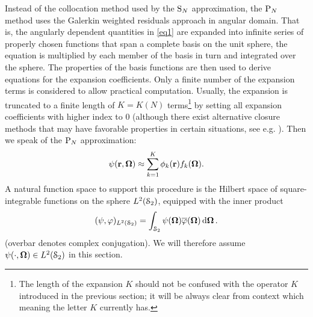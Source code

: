 Instead of the collocation method used by the $\SN$ approximation, the $\PN$ method uses the Galerkin weighted residuals
approach in angular domain. That is, the angularly dependent quantities in \eqref{eq1} are expanded into infinite
series of properly chosen functions that span a complete basis on the unit sphere, the equation is multiplied by each member of the basis in turn
and integrated over the sphere. The properties of the basis functions are then used to derive equations for
the expansion coefficients. Only a finite number of the expansion terms is considered to allow practical computation.
Usually, the expansion is truncated to a finite length of $K = K(N)$ terms\footnote{The length of the expansion $K$
should not be confused with the operator $K$ introduced in the previous section; it will be always clear from context 
which meaning the letter $K$ currently has.} by setting all expansion coefficients with higher index to 0 (although there exist alternative closure methods that may have favorable properties in certain situations, see e.g.
\cite{Frank0}). Then we speak of the $\PN$ approximation:
\begin{equation}\label{eq1.1}
  \psi(\br,\bomega) \approx \sum_{k=1}^{ K} \phi_k(\br) f_k(\bomega).
\end{equation}
A natural function space to support this procedure is the Hilbert space of 
square-integrable functions on the sphere $\Lp[2](\Sphere)$, equipped with the inner product
\begin{equation}\label{eq:s2_ip}
	(\psi, \varphi)_{\Lp[2](\Sphere)} = \intA{\psi(\bomega) {\overline\varphi(\bomega)}}.
\end{equation}
(overbar denotes complex conjugation). 
We will therefore assume \mbox{$\psi(\cdot,\bomega)\in\Lp[2](\Sphere)$} in this section. 

